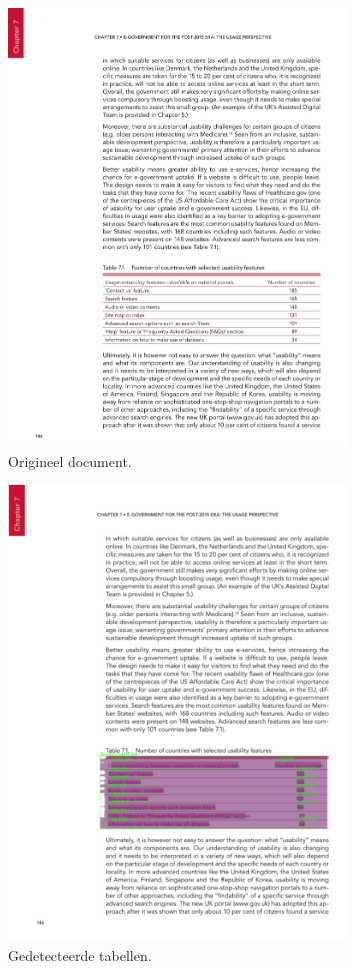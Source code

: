 \begin{figure}[H]
    \centering
    \includegraphics[width=0.8\textwidth]{test-resultaten/9/original.jpg}
    \caption{Origineel document.}
\end{figure}

\begin{figure}[H]
    \centering
    \includegraphics[width=0.8\textwidth]{test-resultaten/9/detected_tables.png}
    \caption{Gedetecteerde tabellen.}
\end{figure}

